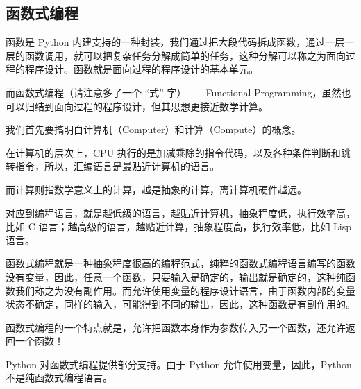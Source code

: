 \hypertarget{ux51fdux6570ux5f0fux7f16ux7a0b}{%
\subsection{函数式编程}\label{ux51fdux6570ux5f0fux7f16ux7a0b}}

函数是 Python
内建支持的一种封装，我们通过把大段代码拆成函数，通过一层一层的函数调用，就可以把复杂任务分解成简单的任务，这种分解可以称之为面向过程的程序设计。函数就是面向过程的程序设计的基本单元。

而函数式编程（请注意多了一个 ``式'' 字）------Functional
Programming，虽然也可以归结到面向过程的程序设计，但其思想更接近数学计算。

我们首先要搞明白计算机（Computer）和计算（Compute）的概念。

在计算机的层次上，CPU
执行的是加减乘除的指令代码，以及各种条件判断和跳转指令，所以，汇编语言是最贴近计算机的语言。

而计算则指数学意义上的计算，越是抽象的计算，离计算机硬件越远。

对应到编程语言，就是越低级的语言，越贴近计算机，抽象程度低，执行效率高，比如
C 语言；越高级的语言，越贴近计算，抽象程度高，执行效率低，比如 Lisp
语言。

函数式编程就是一种抽象程度很高的编程范式，纯粹的函数式编程语言编写的函数没有变量，因此，任意一个函数，只要输入是确定的，输出就是确定的，这种纯函数我们称之为没有副作用。而允许使用变量的程序设计语言，由于函数内部的变量状态不确定，同样的输入，可能得到不同的输出，因此，这种函数是有副作用的。

函数式编程的一个特点就是，允许把函数本身作为参数传入另一个函数，还允许返回一个函数！

Python 对函数式编程提供部分支持。由于 Python 允许使用变量，因此，Python
不是纯函数式编程语言。

